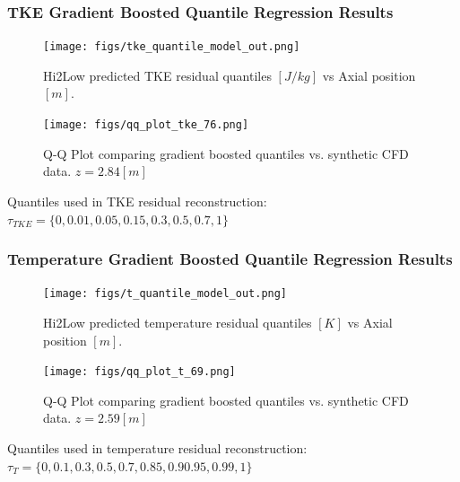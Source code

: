 \documentclass[t, pdftex]{beamer}
\begin{document}
\begin{frame}\frametitle{TKE Gradient Boosted Quantile Regression Results}
    \begin{figure}
        \centering
        \begin{minipage}{.5\textwidth}
            \centering
            \texttt{[image: figs/tke\_quantile\_model\_out.png]}
            \caption{Hi2Low predicted TKE residual quantiles $[J/kg]$ vs Axial position $[m]$.}
        \end{minipage}%
        \begin{minipage}{.5\textwidth}
            \centering
            \texttt{[image: figs/qq\_plot\_tke\_76.png]}
            \caption{Q-Q Plot comparing gradient boosted quantiles vs. synthetic CFD data. $z=2.84[m]$}
        \end{minipage}
    \end{figure}
Quantiles used in TKE residual reconstruction: $\tau_{TKE}=\{0, 0.01, 0.05, 0.15, 0.3, 0.5, 0.7, 1\}$
\end{frame}

\begin{frame}\frametitle{Temperature Gradient Boosted Quantile Regression Results}
    \begin{figure}
        \centering
        \begin{minipage}{.5\textwidth}
            \centering
            \texttt{[image: figs/t\_quantile\_model\_out.png]}
            \caption{Hi2Low predicted temperature residual quantiles $[K]$ vs Axial position $[m]$.}
        \end{minipage}%
        \begin{minipage}{.5\textwidth}
            \centering
            \texttt{[image: figs/qq\_plot\_t\_69.png]}
            \caption{Q-Q Plot comparing gradient boosted quantiles vs. synthetic CFD data. $z=2.59[m]$}
        \end{minipage}
    \end{figure}
Quantiles used in temperature residual reconstruction: $\tau_{T}=\{0, 0.1, 0.3, 0.5, 0.7, 0.85, 0.9 0.95, 0.99, 1\}$
\end{frame}
\end{document}

